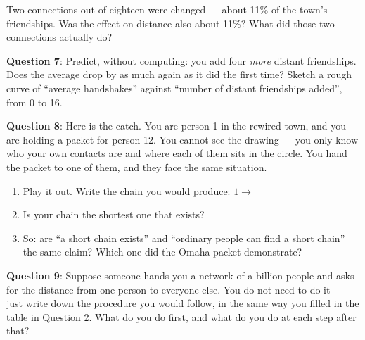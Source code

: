 \documentclass[a4paper, 14pt]{extarticle}
\begin{document}
Two connections out of eighteen were changed --- about 11\% of the town's
friendships. Was the effect on distance also about 11\%? What did those two
connections actually do?

\underline{\hspace{\textwidth}}

\vspace{4em}

{\bf Question 7}:
Predict, without computing: you add four \emph{more} distant friendships. Does
the average drop by as much again as it did the first time? Sketch a rough
curve of ``average handshakes'' against ``number of distant friendships added'',
from 0 to 16.

\begin{center}
\end{center}

\vspace{2em}

{\bf Question 8}:
Here is the catch. You are person 1 in the rewired town, and you are holding a
packet for person 12. You cannot see the drawing --- you only know who your own
contacts are and where each of them sits in the circle. You hand the packet to
one of them, and they face the same situation.

\begin{enumerate}
    \item Play it out. Write the chain you would produce:
    $1 \rightarrow$ \underline{\hspace{6cm}}
    \item Is your chain the shortest one that exists? \underline{\hspace{2cm}}
    \item So: are ``a short chain exists'' and ``ordinary people can find a
          short chain'' the same claim? Which one did the Omaha packet
          demonstrate?

    \underline{\hspace{\textwidth}}
\end{enumerate}

\clearpage

{\bf Question 9}:
Suppose someone hands you a network of a billion people and asks for the
distance from one person to everyone else. You do not need to do it --- just
write down the procedure you would follow, in the same way you filled in the
table in Question 2. What do you do first, and what do you do at each step
after that?
\end{document}
